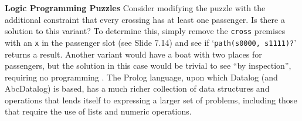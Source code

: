 \begin{minipage}[t]{\sw}
\slidenumber
\LARGE
{\bf Logic Programming Puzzles}\exx
Consider modifying the puzzle with the additional constraint
that every crossing has at least one passenger.
Is there a solution to this variant?
To determine this, simply remove the \verb'cross' premises
with an \verb'x' in the passenger slot (see Slide 7.14)
and see if `\verb'path(s0000, s1111)?'' returns a result.\exx
Another variant would have a boat with two places for passengers,
but the solution in this case would be trivial to see
``by inspection'', requiring no programming .\exx
The Prolog language, upon which Datalog (and AbcDatalog) is based,
has a much richer collection of data structures and operations
that lends itself to expressing a larger set of problems,
including those that require the use of lists and numeric operations.
\end{minipage}
